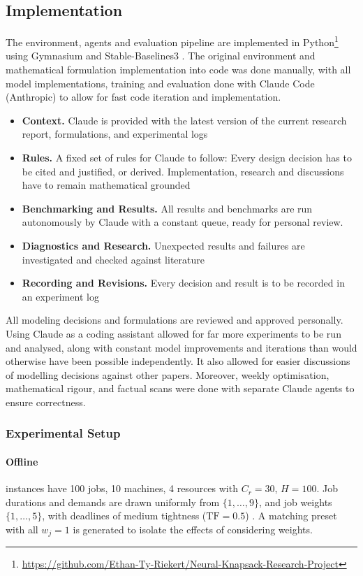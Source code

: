 \documentclass[12pt]{article}
\begin{document}
\subsection{Implementation}
The environment, agents and evaluation pipeline are implemented in Python\footnote{\url{https://github.com/Ethan-Ty-Riekert/Neural-Knapsack-Research-Project}} using Gymnasium and Stable-Baselines3 \cite{raffin2021sb3}. The original environment and mathematical formulation implementation into code was done manually, with all model implementations, training and evaluation done with Claude Code (Anthropic) to allow for fast code iteration and implementation.
\begin{itemize}
    \item \textbf{Context. }Claude is provided with the latest version of the current research report, formulations, and experimental logs
    \item \textbf{Rules. }A fixed set of rules for Claude to follow: Every design decision has to be cited and justified, or derived. Implementation, research and discussions have to remain mathematical grounded
    \item \textbf{Benchmarking and Results. }All results and benchmarks are run autonomously by Claude with a constant queue, ready for personal review.
    \item \textbf{Diagnostics and Research. }Unexpected results and failures are investigated and checked against literature
    \item \textbf{Recording and Revisions. }Every decision and result is to be recorded in an experiment log
\end{itemize}
All modeling decisions and formulations are reviewed and approved personally. Using Claude as a coding assistant allowed for far more experiments to be run and analysed, along with constant model improvements and iterations than would otherwise have been possible independently. It also allowed for easier discussions of modelling decisions against other papers. Moreover, weekly optimisation, mathematical rigour, and factual scans were done with separate Claude agents to ensure correctness.




\subsubsection{Experimental Setup}
\paragraph{Offline} instances have 100 jobs, 10 machines, 4 resources with $C_r=30$, $H=100$. Job durations and demands are drawn uniformly from $\{1,\dots,9\}$, and job weights $\{1,\dots,5\}$, with deadlines of medium tightness ($\mathrm{TF} = 0.5$) \cite{potts1985wtardiness}. A matching preset with all $w_j = 1$ is generated to isolate the effects of considering weights.
\end{document}
